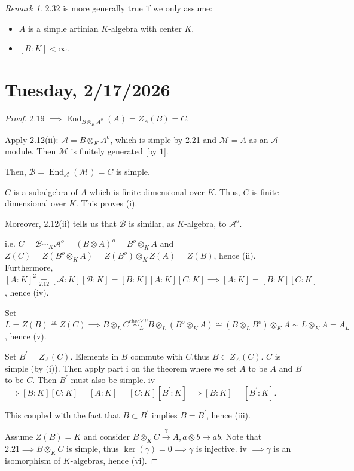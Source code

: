 \documentclass{article}
\theoremstyle{definition}
\theoremstyle{plain}
\theoremstyle{remark}
\newtheorem*{remark*}{Remark}
\begin{document}
    \begin{remark*}
        2.32 is more generally true if we only assume:

        \begin{itemize}
            \item \(A\) is a simple artinian \(K\)-algebra with center \(K\).
            \item \([B:K] < \infty\). 
        \end{itemize} 
    \end{remark*}

    \section*{Tuesday, 2/17/2026}
    
    \begin{proof}
        2.19 \(\implies \operatorname{End}_{B \otimes_K A^o}(A) = Z_A(B) = C\).
        
        Apply 2.12(ii): \(\mathscr{A} = B \otimes_K A^o\), which is simple by 2.21 and \(\mathscr{M} = A\) as an \(\mathscr{A}\)-module. Then \(\mathscr{M}\) is finitely generated [by \(1\)].

        Then, \(\mathscr{B} = \operatorname{End}_{\mathscr{A}} (\mathscr{M}) = C\) is simple.

        \(C\) is a subalgebra of \(A\) which is finite dimensional over \(K\). Thus, \(C\) is finite dimensional over \(K\). This proves (i).

        Moreover, 2.12(ii) tells us that \(\mathscr{B}\) is similar, as \(K\)-algebra, to \(\mathscr{A}^o\).

        i.e. \(C = \mathscr{B} \sim_K \mathscr{A}^o = (B \otimes A)^o = B^o \otimes_K A\) and \(Z(C) = Z(B^o \otimes_K A) = Z(B^o) \otimes_K Z(A) = Z(B)\), hence (ii). Furthermore, \([A:K]^2 \underset{2.12}{=} [\mathscr{A} : K] [\mathscr{B} : K] = [B:K][A:K][C:K] \implies [A:K] = [B:K][C:K]\), hence (iv). 

        Set \(L = Z(B) \overset{ii}{=} Z(C) \implies B \otimes_L C \overset{\text{check!!!}}{\sim_L} B \otimes_L (B^o \otimes_K A) \cong (B \otimes_L B^o) \otimes_K A \sim L \otimes_K A = A_L\), hence (v).
        
        Set \(B^{\prime} = Z_A(C)\). Elements in \(B\) commute with \(C\),thus \(B \subset Z_A(C)\). \(C\) is simple (by (i)). Then apply part i on the theorem where we set \(A\) to be \(A\) and \(B\) to be \(C\). Then \(B^{\prime}\) must also be simple. iv \(\implies [B:K][C:K] = [A:K] = [C:K][B^{\prime}:K] \implies [B:K]=[B^{\prime}:K]\). 

        This coupled with the fact that \(B \subset B^{\prime}\) implies \(B = B^{\prime}\), hence (iii).

        Assume \(Z(B) = K\) and consider \(B \otimes_K C \xrightarrow{\gamma} A, a \otimes b \mapsto ab\). Note that \(2.21 \implies B \otimes_K C\) is simple, thus \(\ker (\gamma) = 0 \implies \gamma\) is injective. iv \(\implies \gamma\) is an isomorphism of \(K\)-algebras, hence (vi). 
    \end{proof}
\end{document}
